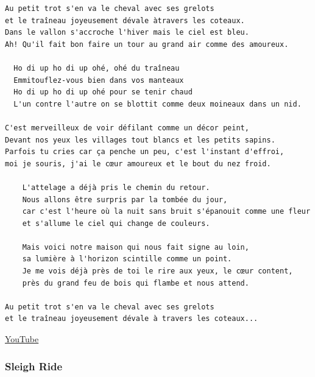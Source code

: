 \documentclass[
]{article}
\begin{document}
\begin{verbatim}
Au petit trot s'en va le cheval avec ses grelots 
et le traîneau joyeusement dévale àtravers les coteaux. 
Dans le vallon s'accroche l'hiver mais le ciel est bleu. 
Ah! Qu'il fait bon faire un tour au grand air comme des amoureux. 

  Ho di up ho di up ohé, ohé du traîneau 
  Emmitouflez-vous bien dans vos manteaux 
  Ho di up ho di up ohé pour se tenir chaud 
  L'un contre l'autre on se blottit comme deux moineaux dans un nid. 

C'est merveilleux de voir défilant comme un décor peint, 
Devant nos yeux les villages tout blancs et les petits sapins. 
Parfois tu cries car ça penche un peu, c'est l'instant d'effroi, 
moi je souris, j'ai le cœur amoureux et le bout du nez froid. 

    L'attelage a déjà pris le chemin du retour. 
    Nous allons être surpris par la tombée du jour, 
    car c'est l'heure où la nuit sans bruit s'épanouit comme une fleur 
    et s'allume le ciel qui change de couleurs. 

    Mais voici notre maison qui nous fait signe au loin, 
    sa lumière à l'horizon scintille comme un point. 
    Je me vois déjà près de toi le rire aux yeux, le cœur content, 
    près du grand feu de bois qui flambe et nous attend. 

Au petit trot s'en va le cheval avec ses grelots 
et le traîneau joyeusement dévale à travers les coteaux...
\end{verbatim}

\href{https://www.youtube.com/watch?v=fIj_W0Z1UII}{YouTube}

\hypertarget{sleigh-ride}{%
\subsubsection*{Sleigh Ride}\label{sleigh-ride}}
\end{document}
